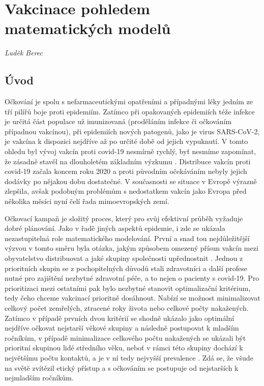 \chapter{Vakcinace pohledem matematických modelů}
\label{Ucinnost_ockovani}

\textit{Luděk Berec}
\vspace{15mm}

\section*{Úvod}

Očkování je spolu s nefarmaceutickými opatřeními a případnými léky jedním ze tří pilířů boje proti epidemiím. Zatímco při opakovaných epidemiích téže infekce je určitá část populace už imunizovaná (proděláním infekce či očkováním případnou vakcínou), při epidemiích nových patogenů, jako je virus SARS-CoV-2, je vakcína k dispozici nejdříve až po určité době od jejich vypuknutí. V tomto ohledu byl vývoj vakcín proti covid-19 nesmírně rychlý, byť nesmíme zapomínat, že zásadně stavěl na dlouholetém základním výzkumu \cite{Pardi_etal2018}. Distribuce vakcín proti covid-19 začala koncem roku 2020 a proti původním očekáváním nebyly jejich dodávky po nějakou dobu dostatečné. V současnosti se situace v Evropě výrazně zlepšila, avšak podobným problémům s nedostatkem vakcín jako Evropa před několika měsíci nyní čelí řada mimoevropských zemí.

Očkovací kampaň je složitý proces, který pro svůj efektivní průběh vyžaduje dobré plánování. Jako v řadě jiných aspektů epidemie, i zde se ukázala nezastupitelná role matematického modelování. První a snad tou nejdůležitější výzvou v tomto směru byla otázka, jakým způsobem omezený přísun vakcín mezi obyvatelstvo distribuovat a jaké skupiny společnosti upřednostnit \cite{Bubar_etal2021,Moore_etal2021b}. Jednou z prioritních skupin se z pochopitelných důvodů stali zdravotníci a další profese nutné pro zajištění nezbytné zdravotní péče, a to nejen o pacienty s covid-19. Pro prioritizaci mezi ostatními pak bylo nezbytné stanovit optimalizační kritérium, tedy čeho chceme vakcinací prioritně dosáhnout. Nabízí se možnost minimalizovat celkový počet zemřelých, ztracené roky života nebo celkové počty nakažených. Zatímco v případě prvních dvou kritérií se shodně ukázalo jako optimální nejdříve očkovat nejstarší věkové skupiny a následně postupovat k mladším ročníkům, v případě minimalizace celkového počtu nakažených se ukázali být prioritní skupinou lidé středního věku, neboť v rámci této skupiny dochází k největšímu počtu kontaktů, a je v ní tedy nejvyšší prevalence \cite{Bubar_etal2021,Moore_etal2021b}. Zdá se, že všude na světě zvítězil etický přístup a s očkováním se postupuje od nejstarších k nejmladším ročníkům.

